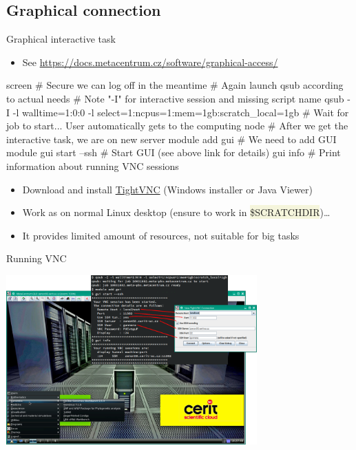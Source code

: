 \documentclass[compress, xelatex, 11pt, xcolor=svgnames, aspectratio=169,
	hyperref={
		bookmarks=true,
		unicode=true,
		colorlinks=true,
		pdftitle={Linux, command line and MetaCentrum},
		plainpages=false,
		pdfauthor={Vojtech Zeisek},
		pdfsubject={Course about use of Linux command line, writing shell scripts and using MetaCentrum of CESNET},
		pdfcreator={XeLaTeX},
		pdfkeywords={Linux, GNU, BASH, shell, command line, MetaCentrum},
		linkcolor=DarkRed, %
		anchorcolor=DarkBlue, %
		citecolor=Indigo, %
		filecolor=NavyBlue, %
		menucolor=DarkMagenta, %
		urlcolor=DarkBlue, %
		},
	url={hyphens, lowtilde} %
	]{beamer}
\renewcommand{\texttt}[1]{\colorbox{Beige}{{\ttfamily #1}}}
\begin{document}
\subsection{Graphical connection}

\begin{frame}[fragile]{Graphical interactive task}
	\begin{itemize}
		\item See \url{https://docs.metacentrum.cz/software/graphical-access/}
	\end{itemize}
	\begin{bashcode}
    screen # Secure we can log off in the meantime
    # Again launch qsub according to actual needs
    # Note "-I" for interactive session and missing script name
    qsub -I -l walltime=1:0:0 -l select=1:ncpus=1:mem=1gb:scratch_local=1gb
    # Wait for job to start... User automatically gets to the computing node
    # After we get the interactive task, we are on new server
    module add gui # We need to add GUI module
    gui start --ssh # Start GUI (see above link for details)
    gui info # Print information about running VNC sessions
	\end{bashcode}
	\begin{itemize}
		\item Download and install \href{https://www.tightvnc.com/}{TightVNC} (Windows installer or Java Viewer)
		\item Work as on normal Linux desktop (ensure to work in \texttt{\$SCRATCHDIR})\ldots
		\item It provides limited amount of resources, not suitable for big tasks
	\end{itemize}
\end{frame}

\begin{frame}{Running VNC}
	\begin{center}
		\includegraphics[height=6.5cm]{vnc.png}
	\end{center}
\end{frame}
\end{document}
